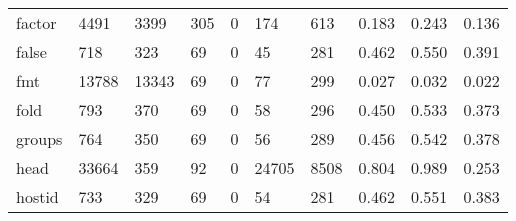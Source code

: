 \begin{longtable}{lp{2.0cm}p{2.0cm}p{2.0cm}p{2.0cm}p{2.0cm}p{2.0cm}p{2.0cm}p{2.0cm}p{2.0cm}}
factor    &                   4491 &                               3399 &                               305 &                                0 &                               174 &                             613 &                                0.183 &                                  0.243 &                                0.136 \\
false     &                    718 &                                323 &                                69 &                                0 &                                45 &                             281 &                                0.462 &                                  0.550 &                                0.391 \\
fmt       &                  13788 &                              13343 &                                69 &                                0 &                                77 &                             299 &                                0.027 &                                  0.032 &                                0.022 \\
fold      &                    793 &                                370 &                                69 &                                0 &                                58 &                             296 &                                0.450 &                                  0.533 &                                0.373 \\
groups    &                    764 &                                350 &                                69 &                                0 &                                56 &                             289 &                                0.456 &                                  0.542 &                                0.378 \\
head      &                  33664 &                                359 &                                92 &                                0 &                             24705 &                            8508 &                                0.804 &                                  0.989 &                                0.253 \\
hostid    &                    733 &                                329 &                                69 &                                0 &                                54 &                             281 &                                0.462 &                                  0.551 &                                0.383 \\

\end{longtable}
